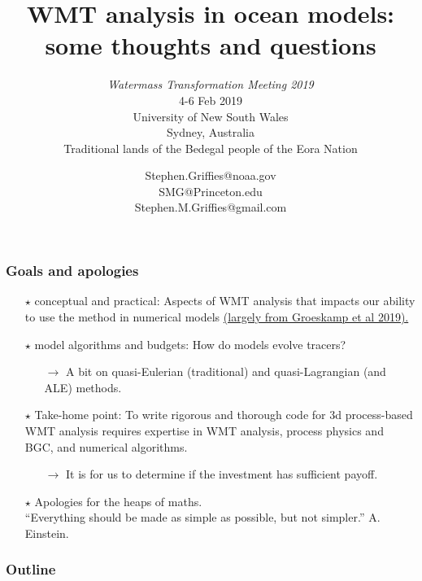 \documentclass[10pt]{beamer}
\title[WMT and numerical models]{WMT analysis in ocean models: \\ some
  thoughts and questions} %
\subtitle{ {\it Watermass Transformation Meeting 2019} \\
  4-6  Feb 2019 \\ \vspace{.25cm}
  University of New South Wales \\
 Sydney, Australia  \\ Traditional lands of the Bedegal people of the Eora Nation
}
\author[{\sc Stephen.M.Griffies@gmail.com}] %
{ {\sc Stephen.Griffies@noaa.gov  \\ SMG@Princeton.edu \\  Stephen.M.Griffies@gmail.com 
} 
}
\institute[NOAA/GFDL + Princeton University]{NOAA/GFDL + Princeton University}
\date{}
\begin{document}
\footnotesize 

  
\begin{frame}
  \titlepage
\end{frame}




\begin{frame}
  \frametitle{Goals and apologies}

\begin{itemize}

\item[$\star$] {\sc conceptual and practical}: Aspects of WMT analysis that
  impacts our ability to use the method in numerical models
  \href{https://www.annualreviews.org/doi/abs/10.1146/annurev-marine-010318-095421}{(largely
    from Groeskamp et al 2019).}

\item [$\star$]  {\sc model algorithms and budgets}: How do models evolve
  tracers?  
\begin{itemize} \footnotesize 
\item[] $\longrightarrow$ A bit on quasi-Eulerian (traditional) and
  quasi-Lagrangian (and ALE) methods.
    \end{itemize}

\item[$\star$] {\sc Take-home point}: To write rigorous and thorough
  code for 3d process-based WMT analysis requires expertise in WMT
  analysis, process physics and BGC, and numerical algorithms.
    \begin{itemize} \footnotesize 
       \item[] $\longrightarrow$ It is for us to determine if the investment has sufficient payoff. 
    \end{itemize}


  \item[$\star$] {\sc Apologies} for the heaps of maths. \\
    ``Everything should be made as simple as possible, but not
    simpler.''  A. Einstein.

\end{itemize}


\end{frame}




\begin{frame}
  \frametitle{Outline}
  \tableofcontents
\end{frame}
\end{document}

